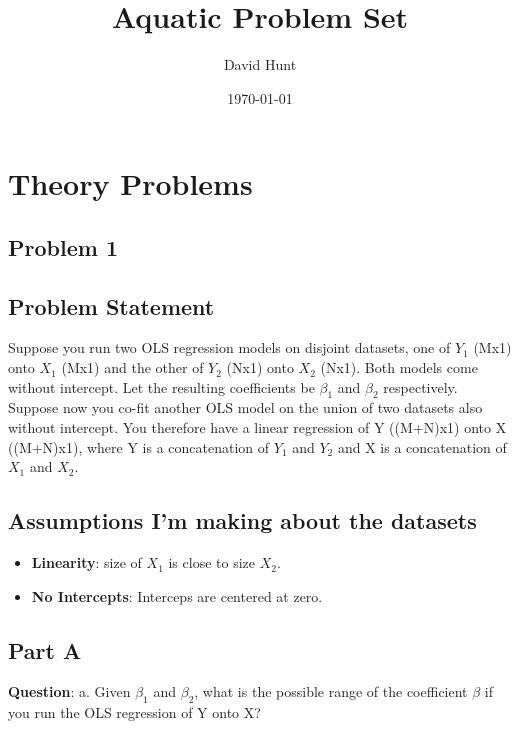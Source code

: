 \documentclass{article}
\title{Aquatic Problem Set}
\author{David Hunt}
\date{\today}
\begin{document}
\maketitle

\section*{Theory Problems}
\subsection*{Problem 1}
\subsection*{Problem Statement}
Suppose you run two OLS regression models on disjoint datasets, one of $Y_1$ (Mx1) onto $X_1$ (Mx1) and the other 
of $Y_2$ (Nx1) onto $X_2$ (Nx1). Both models come without intercept. Let the resulting coefficients be $\beta_1$ and $\beta_2$ respectively. 
Suppose now you co-fit another OLS model on the union of two datasets also without intercept. 
You therefore have a linear regression of Y ((M+N)x1) onto X ((M+N)x1), where Y is a concatenation of $Y_1$ and $Y_2$ and X is a concatenation of $X_1$ and $X_2$. 

\subsection*{Assumptions I'm making about the datasets}
\begin{itemize}
    \item \textbf{Linearity}: size of $X_1$ is close to  size $X_2$.
    \item \textbf{No Intercepts}: Interceps are centered at zero.
\end{itemize}

\subsection*{Part A}
\textbf{Question}: a.	Given $\beta_1$ and $\beta_2$, what is the possible range of the coefficient $\beta$ if you run the OLS regression of Y onto X?
\newline
\end{document}
